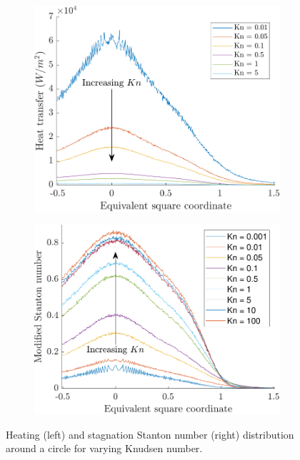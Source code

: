 \begin{figure}
    \centering
    \begin{subfigure}{0.49\textwidth}
        \centering
        \includegraphics[width=\textwidth]{Images/4. Results/Circle Kn/htsec.pdf}
    \end{subfigure}
    \hfill
    \begin{subfigure}{0.49\textwidth}
        \centering
        \includegraphics[width=\textwidth]{Images/4. Results/Circle Kn/stsec.pdf}
    \end{subfigure}
    \caption{Heating (left) and stagnation Stanton number (right) distribution around a circle for varying Knudsen number.}
    \label{fig:heatcontourcircle}
\end{figure}

